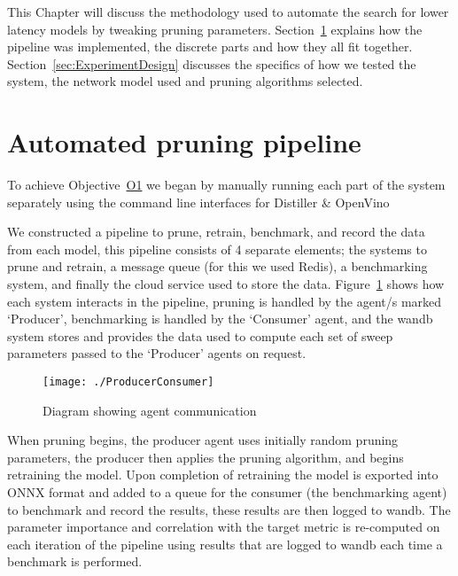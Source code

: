 \documentclass[../Dissertation.tex]{subfiles}
\begin{document}

This Chapter will discuss the methodology used to automate the search for lower latency models by tweaking pruning parameters.
Section~\ref{sec:EngineeringImplementation} explains how the pipeline was implemented, the discrete parts and how they all fit together.
Section~\ref{sec:ExperimentDesign} discusses the specifics of how we tested the system, the network model used and pruning algorithms selected.

\section{Automated pruning pipeline}\label{sec:EngineeringImplementation}

To achieve Objective~\hyperref[obj:BuildPipeline]{O1} we began by manually running each part of the system separately using the command line interfaces for Distiller \& OpenVino

We constructed a pipeline to prune, retrain, benchmark, and record the data from each model, this pipeline consists of 4 separate elements; the systems to prune and retrain, a message queue  (for this we used Redis), a benchmarking system, and finally the cloud service used to store the data.
Figure~\ref{fig:agentCommunication} shows how each system interacts in the pipeline, pruning is handled by the agent/s marked `Producer', benchmarking is handled by the `Consumer' agent, and the \acrfull{wandb} system stores and provides the data used to compute each set of sweep parameters passed to the `Producer' agents on request.

\begin{figure}[H]
    \centering
    \texttt{[image: ./ProducerConsumer]}
    \caption{Diagram showing agent communication}
    \label{fig:agentCommunication}
\end{figure}

When pruning begins, the producer agent uses initially random pruning parameters, the producer then applies the pruning algorithm, and begins retraining the model.
Upon completion of retraining the model is exported into ONNX format and added to a queue for the consumer (the benchmarking agent) to benchmark and record the results, these results are then logged to \acrshort{wandb}.
The parameter importance and correlation with the target metric is re-computed on each iteration of the pipeline using results that are logged to \acrshort{wandb} each time a benchmark is performed.
\end{document}
